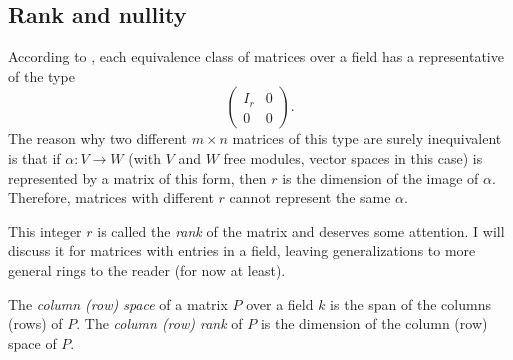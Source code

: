 \subsection{Rank and nullity}
\label{subsec:linalg:rank-and-nullity}
According to , each equivalence class of matrices
over a field has a representative of the type
\[
  \left(
    \begin{array}{c|c}
      I_r & 0 \\
      \hline
      0 & 0
    \end{array}
  \right).
\]
The reason why two different $m \times n$ matrices of this type are
surely inequivalent is that if $\alpha : V \to W$ (with $V$ and $W$
free modules, vector spaces in this case) is represented by a matrix
of this form, then $r$ is the dimension of the image of $\alpha$.
Therefore, matrices with different $r$ cannot represent the same
$\alpha$.

This integer $r$ is called the \emph{rank} of the matrix and deserves
some attention. I will discuss it for matrices with entries in a
field, leaving generalizations to more general rings to the reader
(for now at least).

The \emph{column (row) space} of a matrix $P$ over a field $k$ is the
span of the columns (rows) of $P$. The \emph{column (row) rank} of $P$
is the dimension of the column (row) space of $P$.

